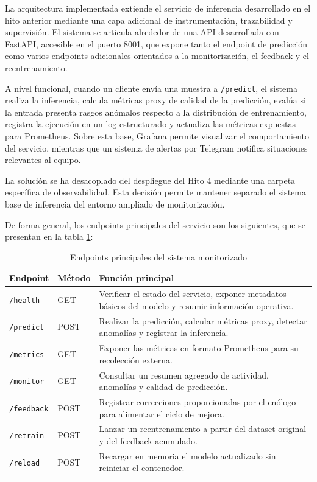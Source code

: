 La arquitectura implementada extiende el servicio de inferencia desarrollado en el hito anterior mediante una capa adicional de instrumentación, trazabilidad y supervisión. El sistema se articula alrededor de una API desarrollada con FastAPI, accesible en el puerto 8001, que expone tanto el endpoint de predicción como varios endpoints adicionales orientados a la monitorización, el feedback y el reentrenamiento.

A nivel funcional, cuando un cliente envía una muestra a \texttt{/predict}, el sistema realiza la inferencia, calcula métricas proxy de calidad de la predicción, evalúa si la entrada presenta rasgos anómalos respecto a la distribución de entrenamiento, registra la ejecución en un log estructurado y actualiza las métricas expuestas para Prometheus. Sobre esta base, Grafana permite visualizar el comportamiento del servicio, mientras que un sistema de alertas por Telegram notifica situaciones relevantes al equipo.

La solución se ha desacoplado del despliegue del Hito 4 mediante una carpeta específica de observabilidad. Esta decisión permite mantener separado el sistema base de inferencia del entorno ampliado de monitorización.

De forma general, los endpoints principales del servicio son los siguientes, que se presentan en la tabla \ref{tab:endpoints_hito5}:

\begin{table}[h]
\centering
\caption{Endpoints principales del sistema monitorizado}
\vspace{0.2cm}
\begin{tabular}{l l p{8.2cm}}
\hline
\textbf{Endpoint} & \textbf{Método} & \textbf{Función principal} \\
\hline
\texttt{/health} & GET & Verificar el estado del servicio, exponer metadatos básicos del modelo y resumir información operativa. \\
\texttt{/predict} & POST & Realizar la predicción, calcular métricas proxy, detectar anomalías y registrar la inferencia. \\
\texttt{/metrics} & GET & Exponer las métricas en formato Prometheus para su recolección externa. \\
\texttt{/monitor} & GET & Consultar un resumen agregado de actividad, anomalías y calidad de predicción. \\
\texttt{/feedback} & POST & Registrar correcciones proporcionadas por el enólogo para alimentar el ciclo de mejora. \\
\texttt{/retrain} & POST & Lanzar un reentrenamiento a partir del dataset original y del feedback acumulado. \\
\texttt{/reload} & POST & Recargar en memoria el modelo actualizado sin reiniciar el contenedor. \\
\hline
\end{tabular}
\label{tab:endpoints_hito5}
\end{table}

